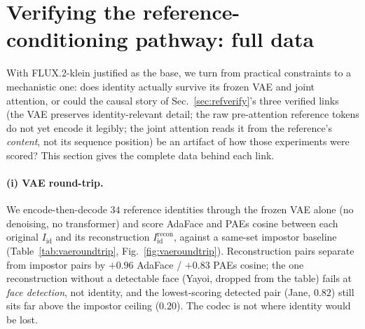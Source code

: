 \section{Verifying the reference-conditioning pathway: full data}
\label{sec:appendix_causal}
With FLUX.2-klein justified as the base, we turn from practical constraints to
a mechanistic one: does identity actually survive its frozen VAE and joint
attention, or could the causal story of Sec.~\ref{sec:refverify}'s three
verified links (the VAE preserves identity-relevant detail; the raw
pre-attention reference tokens do not yet encode it legibly; the joint
attention reads it from the reference's \emph{content}, not its sequence
position) be an artifact of how those experiments were scored? This section
gives the complete data behind each link.

\paragraph{(i) VAE round-trip.} We encode-then-decode $34$ reference identities
through the frozen VAE alone (no denoising, no transformer) and score AdaFace
and PAEs cosine between each original $I_{\mathrm{id}}$ and its reconstruction
$I_{\mathrm{id}}^{\mathrm{recon}}$, against a same-set impostor baseline
(Table~\ref{tab:vaeroundtrip}, Fig.~\ref{fig:vaeroundtrip}). Reconstruction
pairs separate from impostor pairs by $+0.96$ AdaFace / $+0.83$ PAEs cosine;
the one reconstruction without a detectable face (Yayoi, dropped from the
table) fails at \emph{face detection}, not identity, and the lowest-scoring
detected pair (Jane, $0.82$) still sits far above the impostor ceiling
($0.20$). The codec is not where identity would be lost.

\begin{table}[t]\centering\small
\setlength{\tabcolsep}{5pt}
\caption[VAE round-trip identity preservation]{\textbf{VAE round-trip identity preservation} (mean$\pm$std cosine).
Reconstruction pairs (same identity, before vs.\ after the frozen VAE encode-decode)
separate from same-set impostor pairs (different identities, both originals) by
$+0.956$ AdaFace / $+0.830$ PAEs---the VAE alone does not discard
identity-discriminative detail.}
\label{tab:vaeroundtrip}
\end{table}

